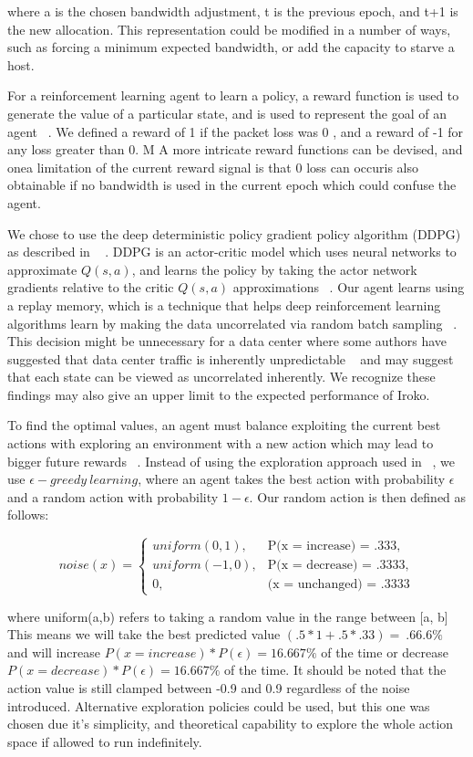 where a is the chosen bandwidth adjustment, t is the previous epoch, and t+1 is the new allocation. This representation could be  modified in a number of ways, such as forcing a minimum expected bandwidth, or add the capacity to starve a host.
 
 
For a reinforcement learning agent to learn a policy, a reward function is used to generate the value of a particular state, and is used to represent the goal of an agent ~\cite{Sutton:1998:IRL:551283}. We defined  a reward of 1 if the packet loss was 0 , and a reward of -1 for any loss greater than 0. M  A more intricate reward functions can be devised, and onea limitation of the current reward signal is that 0 loss can occuris also obtainable if no bandwidth is used in the current epoch which could confuse the agent. 



We chose to use the deep deterministic policy gradient policy algorithm (DDPG) as described in ~\cite{DDPG} . DDPG is an actor-critic model which uses neural networks to approximate $Q(s,a)$, and learns the policy by taking the actor network gradients relative to the critic $Q(s,a)$ approximations ~\cite{DDPG}.  Our agent learns using a replay memory, which is a technique that helps deep reinforcement learning algorithms learn by making the data uncorrelated via random batch sampling ~\cite{DQLearning}. This decision might be unnecessary for a data center where some authors have suggested that data center traffic is inherently unpredictable ~\cite{microte} and may suggest that each state can be viewed as uncorrelated inherently. We recognize these findings may also give an upper limit to the expected performance of Iroko. 

To find the optimal values, an agent must balance exploiting the current best actions with exploring an environment with a new action which may lead to bigger future rewards ~\cite{Sutton:1998:IRL:551283}. Instead of using the exploration approach used in ~\cite{DDPG}, we use $\epsilon-greedy\ learning$, where an agent takes the best action with probability $\epsilon$ and a random action with probability $1 - \epsilon$. Our random action is then defined as follows:

\[
noise(x) = 
\begin{cases}

uniform(0,1), &\text{P(x = increase) = .333},\\
uniform(-1,0), &\text{P(x = decrease) = .3333},\\
0, & \text{(x = unchanged) = .3333}
\end{cases}
\]

where uniform(a,b) refers to taking a random value in the range between [a, b]
This means we will take the best predicted value $(.5 * 1 + .5 * .33) =  ~.66.6\%$  and will increase $P(x= increase) * P(\epsilon) = 16. 667\%$ of the time or decrease $P(x= decrease) * P(\epsilon) = 16. 667\%$ of the time. It should be noted that the action value is still clamped between -0.9 and 0.9 regardless of the noise introduced. Alternative exploration policies could be used, but this one was chosen due it’s simplicity, and theoretical capability to explore the whole action space if allowed to run indefinitely.
